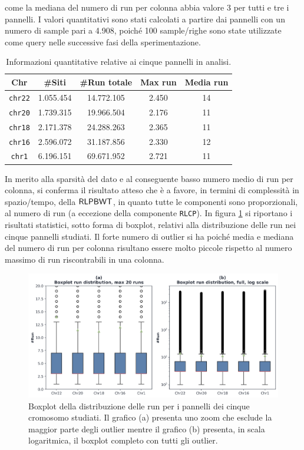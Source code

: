 come la
mediana del numero di run per colonna abbia valore 3 per tutti e tre i pannelli.
I valori quantitativi sono 
stati calcolati a partire dai pannelli con un numero di sample pari a 4.908,
poiché 100 sample/righe sono state utilizzate come query nelle successive
fasi della sperimentazione.
\begin{table}
  \centering
  \caption{Informazioni quantitative relative ai cinque pannelli in analisi.}
  \label{tab:panel}
  \begin{tabular}{c||c|c|c|c}
    \textbf{Chr} & \textbf{\#Siti} & \textbf{\#Run totale}
    & \textbf{Max run} & \textbf{Media run} \\ 
    \hline
    \texttt{chr22} & 1.055.454 & 14.772.105 & 2.450 & 14\\
    \texttt{chr20} & 1.739.315 & 19.966.504 & 2.176 & 11\\
    \texttt{chr18} & 2.171.378 & 24.288.263 & 2.365 & 11\\
    \texttt{chr16} & 2.596.072 & 31.187.856 & 2.330 & 12\\
    \texttt{chr1} & 6.196.151 & 69.671.952 & 2.721 & 11\\
  \end{tabular}
\end{table}
In merito alla sparsità del dato e al
conseguente basso numero medio di run per colonna, si conferma il risultato
atteso che è a favore, in termini di 
complessità in spazio/tempo, della $\mbox{\rm {\sf RLPBWT}}$, in quanto tutte le componenti sono
proporzionali, al numero di run (a eccezione della componente \texttt{RLCP}). In
figura 
\ref{fig:boxplot} si riportano i risultati statistici, sotto forma di
boxplot, relativi alla distribuzione delle run nei cinque pannelli
studiati. Il forte numero di outlier si ha poiché media e 
mediana del numero di run per colonna risultano essere molto piccole rispetto al
numero massimo di run riscontrabili in una colonna.
\begin{figure}
  \centering
  \includegraphics[width = \linewidth]{img/boxplotbi.png}
  \caption{Boxplot della distribuzione delle run per i pannelli dei cinque
    cromosomo studiati. Il grafico (a) presenta uno zoom che esclude la maggior
    parte degli outlier mentre il grafico (b) presenta, in scala logaritmica, il
    boxplot completo con tutti gli outlier.}
  \label{fig:boxplot}
\end{figure}

